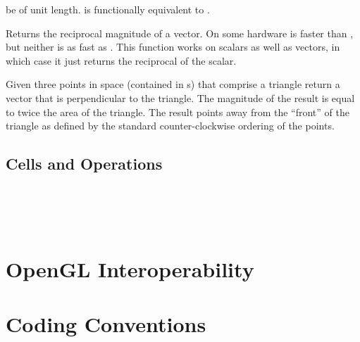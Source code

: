 \begin{description}
  be of unit length.  is
  functionally equivalent to
  .
\item[\daxmath{RMagnitude}] Returns the reciprocal magnitude of a
  vector. On some hardware  is faster than
  , but neither is as fast as
  . This function works on scalars as well
  as vectors, in which case it just returns the reciprocal of the scalar.
\item[\daxmath{TriangleNormal}] Given three points in space (contained in
  s) that comprise a triangle return a vector that is
  perpendicular to the triangle. The magnitude of the result is equal to
  twice the area of the triangle. The result points away from the ``front''
  of the triangle as defined by the standard counter-clockwise ordering of
  the points.
\end{description}


\subsection{Cells and Operations}
\label{sec:CellsAndOperations}

 \\
 \\
 \\



\section{OpenGL Interoperability}
\label{sec:OpenGLInteroperability}


\section{Coding Conventions}
\label{sec:CodingConventions}

